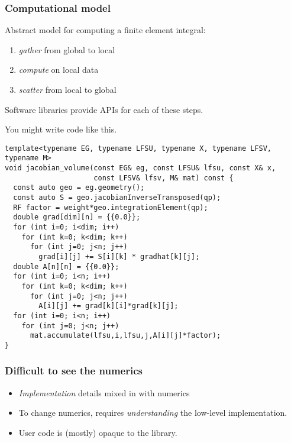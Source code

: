 \documentclass[presentation]{beamer}
\begin{document}
\begin{frame}
  \frametitle{Computational model}
  Abstract model for computing a finite element
  integral:
  \begin{enumerate}
  \item \emph{gather} from global to local
  \item \emph{compute} on local data
  \item \emph{scatter} from local to global
  \end{enumerate}

  Software libraries provide APIs for each of these steps.
\end{frame}
\begin{frame}[fragile]
  You might write code like this.
\begin{verbatim}
template<typename EG, typename LFSU, typename X, typename LFSV, typename M>
void jacobian_volume(const EG& eg, const LFSU& lfsu, const X& x, 
                     const LFSV& lfsv, M& mat) const {
  const auto geo = eg.geometry();
  const auto S = geo.jacobianInverseTransposed(qp);
  RF factor = weight*geo.integrationElement(qp);
  double grad[dim][n] = {{0.0}};
  for (int i=0; i<dim; i++)
    for (int k=0; k<dim; k++)
      for (int j=0; j<n; j++)
        grad[i][j] += S[i][k] * gradhat[k][j];
  double A[n][n] = {{0.0}};
  for (int i=0; i<n; i++)
    for (int k=0; k<dim; k++)
      for (int j=0; j<n; j++)
        A[i][j] += grad[k][i]*grad[k][j];
  for (int i=0; i<n; i++)
    for (int j=0; j<n; j++)
      mat.accumulate(lfsu,i,lfsu,j,A[i][j]*factor);
}
\end{verbatim}
\end{frame}
\begin{frame}
  \frametitle{Difficult to see the numerics}
  \begin{itemize}
  \item \emph{Implementation} details mixed in with numerics
  \item To change numerics, requires \emph{understanding} the
    low-level implementation.
  \item User code is (mostly) opaque to the library.
  \end{itemize}
\end{frame}
\end{document}
